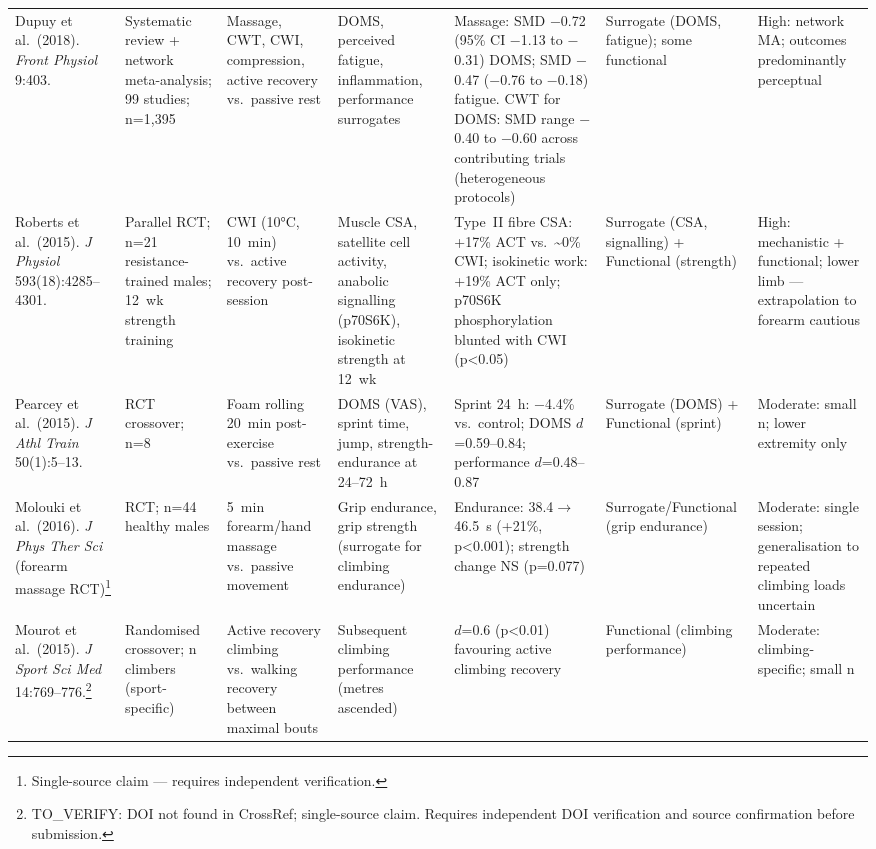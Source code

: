 \begin{center}
\begin{longtable}{@{}>{\raggedright}p{3.0cm} >{\raggedright}p{3cm} >{\raggedright}p{2.5cm} >{\raggedright}p{2.5cm} >{\raggedright}p{2.5cm} >{\raggedright}p{1.6cm} >{\raggedright\arraybackslash}p{1.8cm}@{}}
Dupuy et al.\ (2018). \emph{Front Physiol} 9:403. \cite{DDTE18}
& Systematic review + network meta-analysis; 99 studies; n=1,395
& Massage, CWT, CWI, compression, active recovery vs.\ passive rest
& DOMS, perceived fatigue, inflammation, performance surrogates
& Massage: SMD $-$0.72 (95\% CI $-$1.13 to $-$0.31) DOMS; SMD $-$0.47 ($-$0.76 to $-$0.18) fatigue. CWT for DOMS: SMD range $-$0.40 to $-$0.60 across contributing trials (heterogeneous protocols)
& Surrogate (DOMS, fatigue); some functional
& High: network MA; outcomes predominantly perceptual \\

Roberts et al.\ (2015). \emph{J Physiol} 593(18):4285--4301. \cite{RRME15}
& Parallel RCT; n=21 resistance-trained males; 12~wk strength training
& CWI (10°C, 10~min) vs.\ active recovery post-session
& Muscle CSA, satellite cell activity, anabolic signalling (p70S6K), isokinetic strength at 12~wk
& Type~II fibre CSA: +17\% ACT vs.\ \textasciitilde{}0\% CWI; isokinetic work: +19\% ACT only; p70S6K phosphorylation blunted with CWI (p<0.05)
& Surrogate (CSA, signalling) + Functional (strength)
& High: mechanistic + functional; lower limb --- extrapolation to forearm cautious \\

Pearcey et al.\ (2015). \emph{J Athl Train} 50(1):5--13. \cite{PBKE15}
& RCT crossover; n=8
& Foam rolling 20~min post-exercise vs.\ passive rest
& DOMS (VAS), sprint time, jump, strength-endurance at 24--72~h
& Sprint 24~h: $-$4.4\% vs.\ control; DOMS $d$=0.59--0.84; performance $d$=0.48--0.87
& Surrogate (DOMS) + Functional (sprint)
& Moderate: small n; lower extremity only \\

Molouki et al.\ (2016). \emph{J Phys Ther Sci} (forearm massage RCT)\footnote{Single-source claim --- requires independent verification.}
& RCT; n=44 healthy males
& 5~min forearm/hand massage vs.\ passive movement
& Grip endurance, grip strength (surrogate for climbing endurance)
& Endurance: 38.4$\to$46.5~s (+21\%, p<0.001); strength change NS (p=0.077)
& Surrogate/Functional (grip endurance)
& Moderate: single session; generalisation to repeated climbing loads uncertain \\

Mourot et al.\ (2015). \emph{J Sport Sci Med} 14:769--776.\footnote{TO\_VERIFY: DOI not found in CrossRef; single-source claim. Requires independent DOI verification and source confirmation before submission.}
& Randomised crossover; n climbers (sport-specific)
& Active recovery climbing vs.\ walking recovery between maximal bouts
& Subsequent climbing performance (metres ascended)
& $d$=0.6 (p<0.01) favouring active climbing recovery
& Functional (climbing performance)
& Moderate: climbing-specific; small n \\


\end{longtable}
\end{center}

